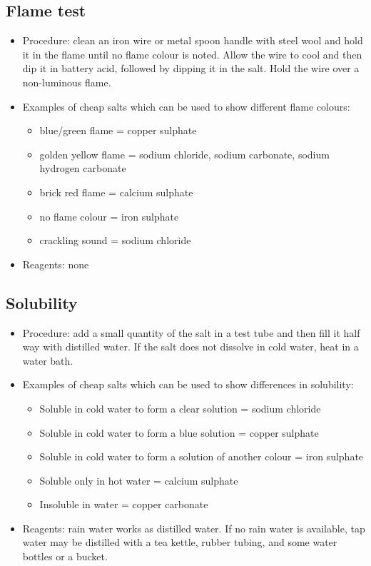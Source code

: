 \subsection{Flame test}
\begin{itemize}
\item{Procedure: clean an iron wire or metal spoon handle 
with steel wool and hold it in the flame until no flame colour is noted. Allow the wire to cool and then dip it in battery acid, followed by dipping it in the salt. Hold the wire over a non-luminous flame.}
\item{Examples of cheap salts which can be used to show different flame colours:}
\begin{itemize}
\item{blue/green flame = copper sulphate}
\item{golden yellow flame = sodium chloride, 
sodium carbonate, 
sodium hydrogen carbonate}
\item{brick red flame = calcium sulphate}
\item{no flame colour = iron sulphate}
\item{crackling sound = sodium chloride}
\end{itemize}
\item{Reagents: none}
\end{itemize}

\subsection{Solubility}
\begin{itemize}
\item{Procedure: add a small quantity of the salt in a test tube 
and then fill it half way with distilled water. 
If the salt does not dissolve in cold water, 
heat in a water bath.}
\item{Examples of cheap salts which can be used to show differences in solubility:}
\begin{itemize}
\item{Soluble in cold water to form a clear solution = sodium chloride}
\item{Soluble in cold water to form a blue solution = copper sulphate}
\item{Soluble in cold water to form a solution of another colour = iron sulphate}
\item{Soluble only in hot water = calcium sulphate} 
\item{Insoluble in water = copper carbonate}
\end{itemize}
\item{Reagents: rain water works as distilled water. 
If no rain water is available, 
tap water may be distilled with a tea kettle, 
rubber tubing, 
and some water bottles or a bucket.}
\end{itemize}

